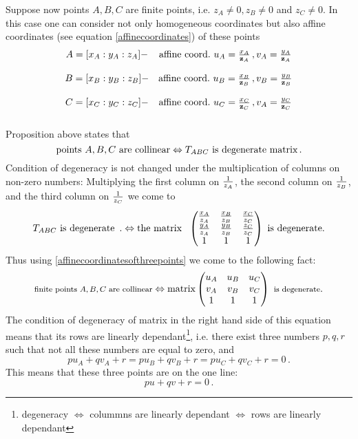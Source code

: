 \documentclass[12pt]{article}
\numberwithin{equation}{section}
\begin{document}
  Suppose now points $A,B,C$ are finite points, i.e.
$z_A\not=0, z_B\not=0$ and $z_C\not=0$.
In this case one can consider not only homogeneous coordinates
 but also affine coordinates (see equation
\eqref{affinecoordinates}) of these points
          \begin{equation}\label{affinecoordinatesofthreepoints}
       \begin{matrix}
   A=[x_A:y_A:z_A]-& \hbox{affine coord.}\,\, 
                   u_A={x_A\over {\bf z}_A}\,, v_A={y_A\over{\bf z}_A}\cr
       \cr
          B=[x_B:y_B:z_B]-& \hbox{affine coord.}\,\, 
                   u_B={x_B\over {\bf z}_B}\,, v_B={y_B\over{\bf z}_B}\cr
       \cr
 C=[x_C:y_C:z_C]-& \hbox{affine coord.}\,\, 
                   u_C={x_C\over {\bf z}_C}\,, v_A={y_C\over{\bf z}_C}\cr
       \cr
\end{matrix}
      \end{equation} 
Proposition above states that
     $$
\hbox {points $A,B,C$ are collinear}\Leftrightarrow
  T_{ABC}\,\,\hbox {is degenerate matrix}\,.
     $$
Condition of degeneracy is not changed under the
multiplication of columns on non-zero numbers:
Multiplying 
the first column on $1\over z_A$,
the second column on $1\over z_B$, and
the third  column on $1\over z_C$ we come to 
     \begin{equation*}
 T_{ABC}\,\,\hbox {is degenerate }\,.
  \Leftrightarrow
  \hbox{the matrix }\,\, 
            \begin{pmatrix}
             {x_A\over z_A} & {x_B\over z_B} & {x_C\over z_C}\cr 
             {y_A\over z_A} & {y_B\over z_B} & {z_C\over z_C}\cr 
                    1 & 1  &  1\cr 
           \end{pmatrix}
        \,\, \hbox {is degenerate}.
\end{equation*}
Thus using \eqref{affinecoordinatesofthreepoints} we come to
the following fact:
          \begin{equation*}
\hbox{{\footnotesize finite points $A,B,C$ are collinear}}\Leftrightarrow
      \hbox {matrix}  \begin{pmatrix}
             u_A & u_B & u_C\cr 
             v_A & v_B & v_C\cr 
                    1 & 1  &  1\cr 
           \end{pmatrix}
    \,\, \hbox {{\footnotesize is degenerate}}.
   \end{equation*}
The condition of degeneracy of matrix 
in the right hand side of this equation means that 
its rows are linearly dependant\footnote{degeneracy 
$\Leftrightarrow$ colummns are linearly dependant 
$\Leftrightarrow$  rows are linearly dependant}, 
i.e.  there exist three numbers $p,q,r$
such that not all these numbers are equal to zero, and
         $$
pu_A+qv_A+r=
pu_B+qv_B+r=
pu_C+qv_C+r=0\,.
         $$
This means that these three points
are on the one line:
    \begin{equation}\label{collinearityaffine}
pu+qv+r=0\,.
    \end{equation}
\end{document}
